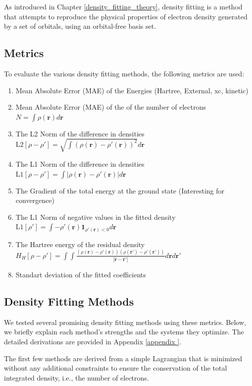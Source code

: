 As introduced in Chapter \ref{density_fitting_theory}, density fitting is a method that attempts to reproduce the physical properties of electron density generated by a set of orbitals, using an orbital-free basis set.
\subsection{Metrics} \label{metrics}
To evaluate the various density fitting methods, the following metrics are used:\begin{enumerate}
    \item Mean Absolute Error (MAE) of the Energies (Hartree, External, xc, kinetic)
    \item Mean Absolute Error (MAE) of the of the number of electrons $N = \int \rho(\mathbf{r}) d\mathbf{r}$
    \item The L2 Norm of the difference in densities $\text{L2}[\rho-\rho'] = \sqrt{\int (\rho(\mathbf{r})-\rho'(\mathbf{r}))^2} d\mathbf{r}$
    \item The L1 Norm of the difference in densities $\text{L1}[\rho-\rho'] = \int |\rho(\mathbf{r})-\rho'(\mathbf{r})| d\mathbf{r}$
    \item The Gradient of the total energy at the ground state (Interesting for convergence)
    \item The L1 Norm of negative values in the fitted density $\text{L1}[\rho'] = \int -\rho'(\mathbf{r})\mathbf{1}_{\rho'(\mathbf{r})<0} d\mathbf{r}$
    \item The Hartree energy of the residual density $H_{H}[\rho-\rho'] = \int \int \frac{(\rho(\mathbf{r})-\rho'(\mathbf{r}))(\rho(\mathbf{r'})-\rho'(\mathbf{r'}))}{|\mathbf{r}-\mathbf{r'}|}d\mathbf{r}d\mathbf{r'}$
    \item Standart deviation of the fitted coefficients
\end{enumerate}
\subsection{Density Fitting Methods}

We tested several promising density fitting methods using these metrics. Below, we briefly explain each method’s strengths and the systems they optimize. The detailed derivations are provided in Appendix \ref{appendix
}.

The first few methods are derived from a simple Lagrangian that is minimized without any additional constraints to ensure the conservation of the total integrated density, i.e., the number of electrons.
